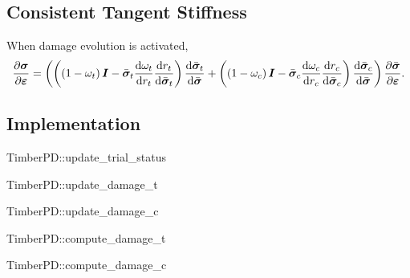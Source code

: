 \subsection{Consistent Tangent Stiffness}
When damage evolution is activated,
\begin{gather}
\dfrac{\partial{\bm{\sigma}}}{\partial{\bm{\varepsilon}}}=\left(\left(\left(1-\omega_t\right)\bm{I}-\bar{\bm{\sigma}}_t\dfrac{\mathrm{d}\omega_t}{\mathrm{d}r_t}\dfrac{\mathrm{d}r_t}{\mathrm{d}\bar{\bm{\sigma}}_t}\right)\dfrac{\mathrm{d}\bar{\bm{\sigma}}_t}{\mathrm{d}\bar{\bm{\sigma}}}
+\left(\left(1-\omega_c\right)\bm{I}-\bar{\bm{\sigma}}_c\dfrac{\mathrm{d}\omega_c}{\mathrm{d}r_c}\dfrac{\mathrm{d}r_c}{\mathrm{d}\bar{\bm{\sigma}}_c}\right)\dfrac{\mathrm{d}\bar{\bm{\sigma}}_c}{\mathrm{d}\bar{\bm{\sigma}}}\right)\dfrac{\partial{\bar{\bm{\sigma}}}}{\partial{\bm{\varepsilon}}}.
\end{gather}
\subsection{Implementation}
\begin{cppcode}
TimberPD::update_trial_status
\end{cppcode}

\begin{cppcode}
TimberPD::update_damage_t
\end{cppcode}

\begin{cppcode}
TimberPD::update_damage_c
\end{cppcode}

\begin{cppcode}
TimberPD::compute_damage_t
\end{cppcode}

\begin{cppcode}
TimberPD::compute_damage_c
\end{cppcode}